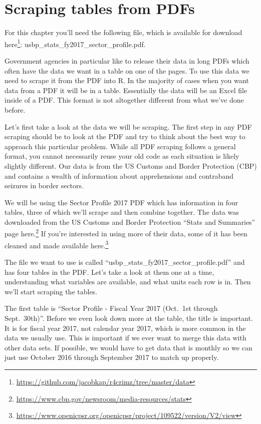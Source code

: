 \documentclass[
  a4paper,
]{krantz}
\renewcommand{\href}[2]{#2\footnote{\url{#1}}}
\begin{document}
\hypertarget{scrape-table}{%
\chapter{Scraping tables from PDFs}\label{scrape-table}}

For this chapter you'll need the following file, which is
available for download
\href{https://github.com/jacobkap/r4crimz/tree/master/data}{here}:
usbp\_stats\_fy2017\_sector\_profile.pdf.

Government agencies in particular like to release their data
in long PDFs which often have the data we want in a table on
one of the pages. To use this data we need to scrape it from
the PDF into R. In the majority of cases when you want data
from a PDF it will be in a table. Essentially the data will
be an Excel file inside of a PDF. This format is not
altogether different from what we've done before.

Let's first take a look at the data we will be scraping. The
first step in any PDF scraping should be to look at the PDF
and try to think about the best way to approach this
particular problem. While all PDF scraping follows a general
format, you cannot necessarily reuse your old code as each
situation is likely slightly different. Our data is from the
US Customs and Border Protection (CBP) and contains a wealth
of information about apprehensions and contraband seizures
in border sectors.

We will be using the Sector Profile 2017 PDF which has
information in four tables, three of which we'll scrape and
then combine together. The data was downloaded from the US
Customs and Border Protection ``Stats and Summaries'' page
\href{https://www.cbp.gov/newsroom/media-resources/stats}{here.}
If you're interested in using more of their data, some of it
has been cleaned and made available
\href{https://www.openicpsr.org/openicpsr/project/109522/version/V2/view}{here.}

The file we want to use is called
``usbp\_stats\_fy2017\_sector\_profile.pdf'' and has four
tables in the PDF. Let's take a look at them one at a time,
understanding what variables are available, and what units
each row is in. Then we'll start scraping the tables.

The first table is ``Sector Profile - Fiscal Year 2017
(Oct.~1st through Sept.~30th)''. Before we even look down
more at the table, the title is important. It is for fiscal
year 2017, not calendar year 2017, which is more common in
the data we usually use. This is important if we ever want
to merge this data with other data sets. If possible, we
would have to get data that is monthly so we can just use
October 2016 through September 2017 to match up properly.
\end{document}
